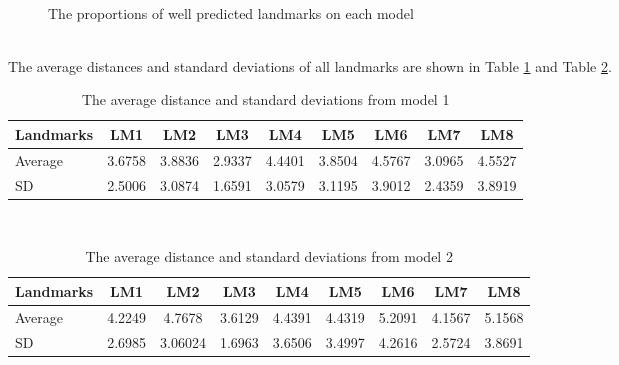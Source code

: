 \documentclass[12pt,a4paper]{article}
\begin{document}
\begin{figure}[h!]
\centering
{}~~
\caption{The proportions of well predicted landmarks on each model}
\label{expr22s}
\end{figure}~\\
The average distances and standard deviations of all landmarks are shown in Table \ref{sdmodel1} and Table \ref{sdmodel2}.
\begin{table}[h!]
	\centering
	\begin{tabular}{l c c c c c c c c}
		Landmarks & LM1 & LM2 & LM3 & LM4 & LM5 & LM6 & LM7 & LM8 \\ \hline
		Average & 3.6758 &	3.8836 & 	2.9337 & 	4.4401 &	 3.8504 &	4.5767 &	 3.0965 &	4.5527

 \\ \hline
		SD & 2.5006 &	3.0874 & 	1.6591 & 	3.0579 & 	3.1195 &	 3.9012 &	2.4359 &	3.8919
 \\ \hline
	\end{tabular}
	\caption{The average distance and standard deviations from model 1}
	\label{sdmodel1}
\end{table}~\\
\begin{table}[h!]
	\centering
	\begin{tabular}{l c c c c c c c c}
		Landmarks & LM1 & LM2 & LM3 & LM4 & LM5 & LM6 & LM7 & LM8 \\ \hline
		Average & 4.2249 & 4.7678 & 3.6129 &	4.4391	 & 4.4319	& 5.2091 &	 4.1567 &	5.1568
 \\ \hline
		SD & 2.6985 &	3.06024 & 1.6963	& 3.6506 & 	3.4997 &	4.2616 &	2.5724 &	3.8691
 \\ \hline
	\end{tabular}
	\caption{The average distance and standard deviations from model 2}
	\label{sdmodel2}
\end{table}~\\
\end{document}
